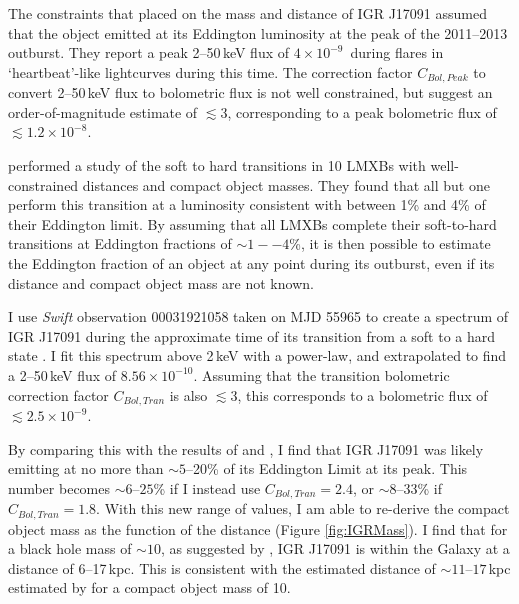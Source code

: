 \par The constraints that \citealp{Altamirano_IGR_FH} placed on the mass and distance of IGR J17091 assumed that the object emitted at its Eddington luminosity at the peak of the 2011--2013 outburst.  They report a peak 2--50\,keV flux of $4\times10^{-9}$\ergf\ during flares in `heartbeat'\indexrho-like lightcurves during this time.  The correction factor $C_{Bol,Peak}$ to convert 2--50\,keV flux to bolometric flux is not well constrained, but \citealp{Altamirano_IGR_FH} suggest an order-of-magnitude estimate of $\lesssim3$, corresponding to a peak bolometric flux of $\lesssim1.2\times10^{-8}$\ergf .
\par \citealp{Maccarone_2pct} performed a study of the soft to hard transitions in 10 LMXBs with well-constrained distances and compact object masses.  They found that all but one perform this transition at a luminosity consistent with between 1\% and 4\% of their Eddington limit.  By assuming that all LMXBs complete their soft-to-hard transitions at Eddington fractions of $\sim1--4$\%, it is then possible to estimate the Eddington fraction of an object at any point during its outburst, even if its distance and compact object mass are not known.
\par I use \indexswift\textit{Swift} observation 00031921058 taken on MJD 55965 to create a spectrum of IGR J17091 during the approximate time of its transition from a soft to a hard state \citep{Drave_Return}.  I fit this spectrum above 2\,keV with a power-law, and extrapolated to find a 2--50\,keV flux of $8.56\times10^{-10}$\ergf .  Assuming that the transition bolometric correction factor $C_{Bol,Tran}$ is also $\lesssim3$, this corresponds to a bolometric flux of $\lesssim2.5\times10^{-9}$\ergf .
\par By comparing this with the results of \citealp{Maccarone_2pct} and \citealp{Altamirano_IGR_FH}, I find that IGR J17091 was likely emitting at no more than $\sim5$--20\% of its Eddington Limit at its peak.  This number becomes $\sim6\mbox{--}25$\% if I instead use $C_{Bol,Tran}=2.4$, or $\sim8\mbox{--}33$\% if $C_{Bol,Tran}=1.8$.  With this new range of values, I am able to re-derive the compact object mass as the function of the distance (Figure \ref{fig:IGRMass}).  I find that for a black hole mass of $\sim10$\ms , as suggested by \citealp{Iyer_Bayes}, IGR J17091 is within the Galaxy at a distance of 6--17\,kpc.  This is consistent with the estimated distance of $\sim11\mbox{--}17$\,kpc estimated by \citealp{Rodriguez_D} for a compact object mass of 10\ms .

